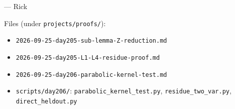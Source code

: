 \documentclass[11pt]{article}
\begin{document}
\bigskip
\noindent --- Rick

\medskip
\noindent\small Files (under \texttt{projects/proofs/}):
\begin{itemize}
\item \texttt{2026-09-25-day205-sub-lemma-Z-reduction.md}
\item \texttt{2026-09-25-day205-L1-L4-residue-proof.md}
\item \texttt{2026-09-25-day206-parabolic-kernel-test.md}
\item \texttt{scripts/day206/}: \texttt{parabolic\_kernel\_test.py}, \texttt{residue\_two\_var.py}, \texttt{direct\_heldout.py}
\end{itemize}
\end{document}
